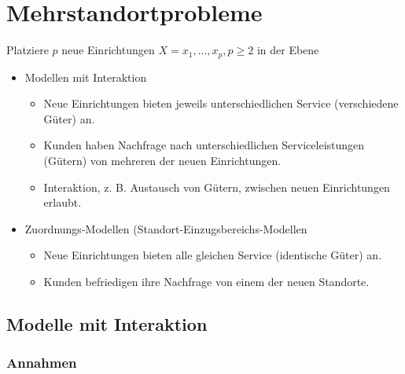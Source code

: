     

  

  \section{Mehrstandortprobleme} %
  \label{sec:mehrstandortprobleme}

    \begin{exmp}
      {\color{blue}{Aufgabe 10}}
    \end{exmp}

    \par Platziere $p$ neue Einrichtungen $X={x_1, \dots, x_p}, p \geq 2$ in der Ebene

    \begin{itemize}
      \item Modellen mit Interaktion
        \begin{itemize}
          \item Neue Einrichtungen bieten jeweils unterschiedlichen Service (verschiedene Güter) an.
          \item Kunden haben Nachfrage nach unterschiedlichen Serviceleistungen (Gütern) von mehreren der neuen Einrichtungen.
          \item Interaktion, z. B. Austausch von Gütern, zwischen neuen Einrichtungen erlaubt.
        \end{itemize}
      \item Zuordnungs-Modellen (Standort-Einzugsbereichs-Modellen
        \begin{itemize}
          \item Neue Einrichtungen bieten alle gleichen Service (identische Güter) an.
          \item Kunden befriedigen ihre Nachfrage von einem der neuen Standorte.
        \end{itemize}
    \end{itemize}
  
    \subsection{Modelle mit Interaktion} %
    \label{sub:modelle_mit_interaktion}

      \subsubsection{Annahmen} %
      \label{ssub:annahmen}

